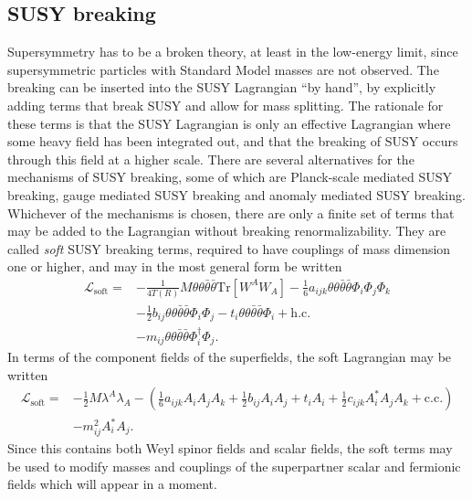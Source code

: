 \documentclass[twoside,english]{uiofysmaster}
\begin{document}
\subsection{SUSY breaking}
Supersymmetry has to be a broken theory, at least in the low-energy limit, since supersymmetric particles with Standard Model masses are not observed. The breaking can be inserted into the SUSY Lagrangian ``by hand'', by explicitly adding terms that break SUSY and allow for mass splitting. The rationale for these terms is that the SUSY Lagrangian is only an effective Lagrangian where some heavy field has been integrated out, and that the breaking of SUSY occurs through this field at a higher scale. There are several alternatives for the mechanisms of SUSY breaking, some of which are Planck-scale mediated SUSY breaking, gauge mediated SUSY breaking and anomaly mediated SUSY breaking. Whichever of the mechanisms is chosen, there are only a finite set of terms that may be added to the Lagrangian without breaking renormalizability. They are called {\it soft} SUSY breaking terms, required to have couplings of mass dimension one or higher, and may in the most general form be written
\begin{align}
	\mathcal{L}_\mathrm{soft} = &-\frac{1}{4T(R)}M\theta\theta\bar\theta\bar\theta \mathrm{Tr} [W^A W_A] - \frac{1}{6}a_{ijk} \theta\theta\bar\theta\bar\theta\Phi_i \Phi_j \Phi_k\nonumber\\
	&-\frac{1}{2}b_{ij} \theta\theta\bar\theta\bar\theta\Phi_i \Phi_j - t_i \theta\theta\bar\theta\bar\theta \Phi_i + \mathrm{h.c.}\\
	&-m_{ij} \theta\theta\bar\theta\bar\theta \Phi_i^\dag \Phi_j.\nonumber
\end{align}
In terms of the component fields of the superfields, the soft Lagrangian may be written
\begin{align}
	\mathcal{L}_\mathrm{soft} = &-\frac{1}{2} M\lambda^A\lambda_A - \left( \frac{1}{6} a_{ijk} A_i A_j A_k + \frac{1}{2} b_{ij} A_i A_j + t_i A_i + \frac{1}{2} c_{ijk} A^*_i A_j A_k + \mathrm{c.c.}\right)\\
	&- m_{ij}^2 A_i^* A_j.
\end{align}
Since this contains both Weyl spinor fields and scalar fields, the soft terms may be used to modify masses and couplings of the superpartner scalar and fermionic fields which will appear in a moment.
\end{document}
